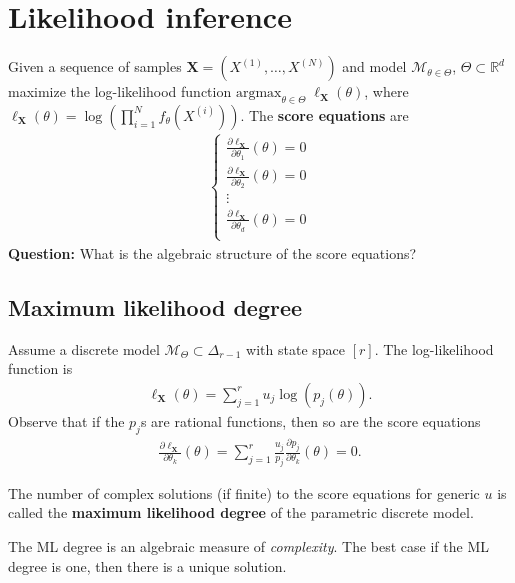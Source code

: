 \section{Likelihood inference}

Given a sequence of samples \( \mathbf X = ( X^{(1)}, \dots, X^{(N)} ) \) and model \( \mathcal{M}_{\theta \in \Theta} \), \( \Theta \subset \mathbb{R}^d \) maximize the log-likelihood function \(   \mathrm{argmax}_{\theta \in \Theta} \; \ell_{\mathbf X}(\theta) \), where \( \ell_{\mathbf X}(\theta) = \log\left( \prod^N_{i=1} f_\theta(X^{(i)}) \right) \). The \textbf{score equations} are 
\begin{align*}
  \begin{cases}
    \frac{\partial \ell_\mathbf X}{\partial\theta_1}(\theta) = 0 \\
    \frac{\partial \ell_\mathbf X}{\partial\theta_2}(\theta) = 0 \\
\vdots \\
\frac{\partial \ell_\mathbf X}{\partial\theta_d}(\theta) = 0 \\
  \end{cases}
\end{align*}
\textbf{Question:} What is the algebraic structure of the score equations?

\subsection{Maximum likelihood degree}

Assume a discrete model \( \mathcal{M}_\Theta \subset \Delta_{r - 1} \) with state space \( [r] \). The log-likelihood function is 
\begin{align*}
  \ell_{\mathbf X}(\theta) = \sum^r_{j=1} u_j \log(p_j(\theta)).
\end{align*}
Observe that if the \( p_j \)s are rational functions, then so are the score equations 
\begin{align*}
  \frac{\partial \ell_{\mathbf X}}{\partial\theta_k}(\theta) = \sum^r_{j=1}  \frac{u_j}{p_j} \frac{\partial p_j}{\partial\theta_k}(\theta) = 0.
\end{align*}

\begin{defi}
  The number of complex solutions (if finite) to the score equations for generic \( u \) is called the \textbf{maximum likelihood degree} of the parametric discrete model.
\end{defi}

The ML degree is an algebraic measure of \emph{complexity}. The best case if the ML degree is one, then there is a unique solution.


